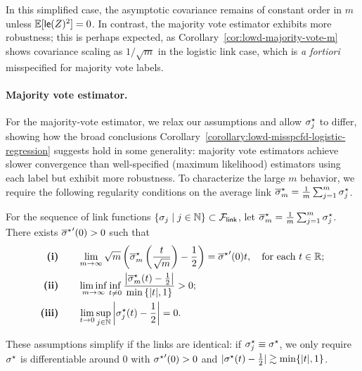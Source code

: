 In this simplified case, the asymptotic covariance remains of constant
order in $m$ unless $\mathbb{E}[\mathsf{le}(Z)^2] = 0$.  In contrast,
the majority vote estimator exhibits more robustness; this is perhaps
expected, as Corollary~\ref{cor:lowd-majority-vote-m} shows covariance scaling as $1/\sqrt{m}$ in the
logistic link case, which is \emph{a fortiori} misspecified for majority
vote labels.

\paragraph{Majority vote estimator.}
For the majority-vote estimator, we relax our assumptions and allow
$\sigma_j^\star$ to differ, showing how the broad conclusions
Corollary~\ref{corollary:lowd-misspcfd-logistic-regression} suggests
hold in some generality: majority vote estimators achieve slower
convergence than well-specified (maximum likelihood) estimators using each
label but exhibit more robustness.
%
To characterize the large $m$
behavior, we require the following regularity conditions on
the average link $\overline{\sigma}_m^\star = \frac{1}{m} \sum_{j=1}^m \sigma_j^\star$.
%

\begin{assumption} \label{assumption:condition-misspcfd-link-majority-vote}
  For the sequence of link functions $\{\sigma_j \mid j \in \mathbb{N}\}
  \subset \mathcal{F}_{\mathsf{link}}$, let $\overline{\sigma}_m^\star = \frac{1}{m} \sum_{j=1}^m
  \sigma_j^\star$. There exists ${\overline{\sigma}^\star}'(0) >0$ such that
  \begin{subequations}
    \begin{align}
      \bm{\mathrm{(i)}} \qquad  & \lim_{m \to \infty} \sqrt{m} \left({\overline{\sigma}_m^\star\left({\frac{t}{\sqrt m}}\right) - \frac 1 2}\right) = {\overline{\sigma}^\star}'(0) t   , \quad \textrm{for each } t \in \mathbb{R}  ; \label{ass:misspcfd-link-1} \\
      \bm{\mathrm{(ii)}} \qquad &\liminf_{m \to \infty} \inf_{t \neq 0} \frac{\left|\overline{\sigma}_m^\star(t) - \frac 1 2 \right|}{\min \left\{|t|, 1\right\}} > 0  ; \label{ass:misspcfd-link-2} \\
      \bm{\mathrm{(iii)}} \qquad &\lim_{t \to 0} \sup_{j \in \mathbb{N}}
      \left|\sigma_j^\star(t) - \frac 1 2 \right| = 0  . \label{ass:misspcfd-link-3}
    \end{align}
  \end{subequations}
\end{assumption}
\noindent
These assumptions simplify if the links are identical:
if $\sigma_j^\star \equiv \sigma^\star$,
we only require $\sigma^\star$ is differentiable around
$0$ with ${\sigma^\star}'(0) >0$ and $|\sigma^\star(t) - \frac{1}{2}|
\gtrsim \min\{|t|, 1\}$.


